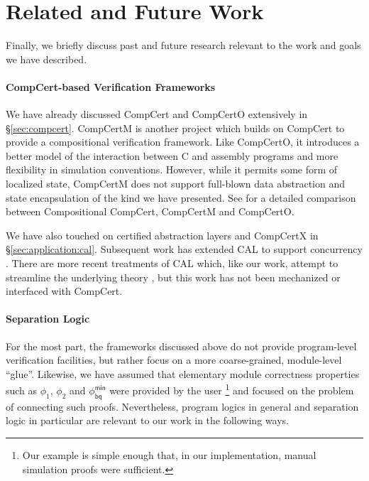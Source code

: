 \documentclass[acmsmall,screen,review,anonymous]{acmart}
\newcommand{\kw}[1]{\ensuremath{ \mathsf{#1} }}
\begin{document}
\section{Related and Future Work} \label{sec:rw} %

Finally, we briefly discuss past and future research
relevant to the work and goals we have described.

\paragraph{CompCert-based Verification Frameworks} %

We have already discussed CompCert and CompCertO
extensively in \S\ref{sec:compcert}.
CompCertM \cite{compcertm} is another project
which builds on CompCert
to provide a compositional verification framework.
Like CompCertO,
it introduces a better model of the interaction between
C and assembly programs
and more flexibility in simulation conventions.
However, while it permits some form of localized state,
CompCertM does not support
full-blown data abstraction and state encapsulation
of the kind we have presented.
See \citet{compcerto}
for a detailed comparison between Compositional CompCert,
CompCertM and CompCertO.

We have also touched on
certified abstraction layers and CompCertX in \S\ref{sec:application:cal}.
Subsequent work has extended CAL to support concurrency \cite{ccal}.
There are more recent treatments of CAL which,
like our work,
attempt to streamline the underlying theory
\citep{popl22,rbgs-cal},
but this work has not been mechanized
or interfaced with CompCert.



\paragraph{Separation Logic} %

For the most part,
the frameworks discussed above
do not provide program-level verification facilities,
but rather focus on a more coarse-grained, module-level ``glue''.
Likewise,
we have assumed that elementary module correctness properties
such as $\phi_1$, $\phi_2$ and $\phi_\kw{bq}^\kw{min}$
were provided by the user%
\footnote{Our example is simple enough that,
  in our implementation,
  manual simulation proofs were
  sufficient.}
and focused on the problem of
connecting such proofs.
Nevertheless,
program logics in general and separation logic in particular
are relevant to our work in the following ways.
\end{document}
